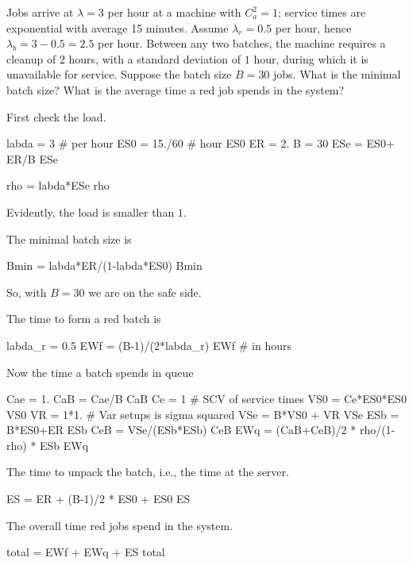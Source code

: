 \begin{exercise}
  Jobs arrive at $\lambda=3$ per hour at a machine with $C_a^2=1$; service times are exponential with average 15 minutes.  Assume $\lambda_r = 0.5$ per hour, hence $\lambda_b = 3-0.5=2.5$ per hour. Between any two batches, the machine requires a cleanup of 2 hours, with a standard deviation of $1$ hour, during which it is unavailable for service.  Suppose the batch size $B=30$ jobs. What is the minimal batch size?  What is the average time a red job spends in the system? 
  \begin{solution}
First check the load.
\begin{pyconsole}
labda = 3 # per hour
ES0 = 15./60 # hour
ES0
ER = 2.
B = 30
ESe = ES0+ ER/B
ESe

rho = labda*ESe
rho
\end{pyconsole}
Evidently, the load is smaller than $1$. 

The minimal batch size is
\begin{pyconsole}
Bmin = labda*ER/(1-labda*ES0)
Bmin
\end{pyconsole}
So, with $B=30$ we are on the safe side. 

The time to form a red batch is 
\begin{pyconsole}
labda_r = 0.5
EWf = (B-1)/(2*labda_r)
EWf # in hours
\end{pyconsole}

Now the time a batch spends in queue
\begin{pyconsole}
Cae = 1.
CaB = Cae/B
CaB
Ce = 1 # SCV of service times
VS0 = Ce*ES0*ES0
VS0
VR = 1*1. # Var setups is sigma squared
VSe = B*VS0 + VR
VSe
ESb = B*ES0+ER
ESb
CeB = VSe/(ESb*ESb)
CeB
EWq = (CaB+CeB)/2 * rho/(1-rho) * ESb
EWq
\end{pyconsole}

The time to unpack the batch, i.e., the time at the server. 
\begin{pyconsole}
ES = ER + (B-1)/2 * ES0 + ES0  
ES
\end{pyconsole}


The overall time red jobs spend in the system.
\begin{pyconsole}
total = EWf + EWq + ES
total
\end{pyconsole}

  \end{solution}
\end{exercise}


